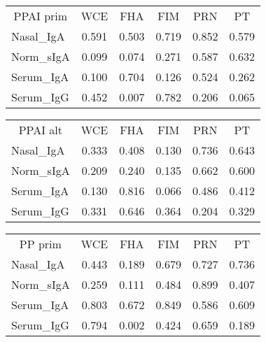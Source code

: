 \documentclass[
]{article}
\begin{document}
\begin{tabular}{>{}l|>{}c|>{}c|>{}c|>{}c|c}
\hline
\multicolumn{1}{c|}{PPAI prim} & \multicolumn{1}{c|}{WCE} & \multicolumn{1}{c|}{FHA} & \multicolumn{1}{c|}{FIM} & \multicolumn{1}{c|}{PRN} & \multicolumn{1}{c}{PT} \\
\cline{1-1} \cline{2-2} \cline{3-3} \cline{4-4} \cline{5-5} \cline{6-6}
Nasal\_IgA & 0.591 & 0.503 & 0.719 & 0.852 & 0.579\\
\hline
Norm\_sIgA & 0.099 & 0.074 & 0.271 & 0.587 & 0.632\\
\hline
Serum\_IgA & 0.100 & 0.704 & 0.126 & 0.524 & 0.262\\
\hline
Serum\_IgG & 0.452 & 0.007 & 0.782 & 0.206 & 0.065\\
\hline
\end{tabular}

\begin{tabular}{>{}l|>{}c|>{}c|>{}c|>{}c|c}
\hline
\multicolumn{1}{c|}{PPAI alt} & \multicolumn{1}{c|}{WCE} & \multicolumn{1}{c|}{FHA} & \multicolumn{1}{c|}{FIM} & \multicolumn{1}{c|}{PRN} & \multicolumn{1}{c}{PT} \\
\cline{1-1} \cline{2-2} \cline{3-3} \cline{4-4} \cline{5-5} \cline{6-6}
Nasal\_IgA & 0.333 & 0.408 & 0.130 & 0.736 & 0.643\\
\hline
Norm\_sIgA & 0.209 & 0.240 & 0.135 & 0.662 & 0.600\\
\hline
Serum\_IgA & 0.130 & 0.816 & 0.066 & 0.486 & 0.412\\
\hline
Serum\_IgG & 0.331 & 0.646 & 0.364 & 0.204 & 0.329\\
\hline
\end{tabular}

\begin{tabular}{>{}l|>{}c|>{}c|>{}c|>{}c|c}
\hline
\multicolumn{1}{c|}{PP prim} & \multicolumn{1}{c|}{WCE} & \multicolumn{1}{c|}{FHA} & \multicolumn{1}{c|}{FIM} & \multicolumn{1}{c|}{PRN} & \multicolumn{1}{c}{PT} \\
\cline{1-1} \cline{2-2} \cline{3-3} \cline{4-4} \cline{5-5} \cline{6-6}
Nasal\_IgA & 0.443 & 0.189 & 0.679 & 0.727 & 0.736\\
\hline
Norm\_sIgA & 0.259 & 0.111 & 0.484 & 0.899 & 0.407\\
\hline
Serum\_IgA & 0.803 & 0.672 & 0.849 & 0.586 & 0.609\\
\hline
Serum\_IgG & 0.794 & 0.002 & 0.424 & 0.659 & 0.189\\
\hline
\end{tabular}
\end{document}
